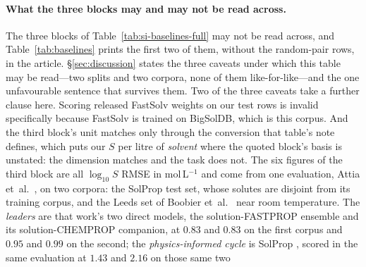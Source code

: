 \paragraph{What the three blocks may and may not be read across.}
The three blocks of Table~\ref{tab:si-baselines-full} may not be read across, and
Table~\ref{tab:baselines} prints the first two of them, without the random-pair rows, in the
article.
\S\ref{sec:discussion} states the three caveats under which this table may be read---two splits and
two corpora, none of them like-for-like---and the one unfavourable sentence that survives them. Two
of the three caveats take a further clause here. Scoring released FastSolv weights on our test rows
is invalid specifically because FastSolv is trained on BigSolDB, which is this corpus. And the third
block's unit matches only through the conversion that table's note defines, which puts our $S$ per
litre of \emph{solvent} where the quoted block's basis is unstated: the dimension matches and the
task does not.
The six figures of the third block are all $\log_{10}S$ RMSE in
mol\,L$^{-1}$ and come from one evaluation, Attia et~al.\ \cite{osanloo2024}, on two corpora: the
SolProp test set, whose solutes are disjoint from its training corpus, and the Leeds set of Boobier
et~al.\ \cite{boobier2020} near room temperature. The \emph{leaders} are that work's two direct models, the
solution-FASTPROP ensemble and its solution-CHEMPROP companion, at $0.83$ and $0.83$ on the first
corpus and $0.95$ and $0.99$ on the second; the \emph{physics-informed cycle} is SolProp
\cite{vermeire2022solprop}, scored in the same evaluation at $1.43$ and $2.16$ on those same two
